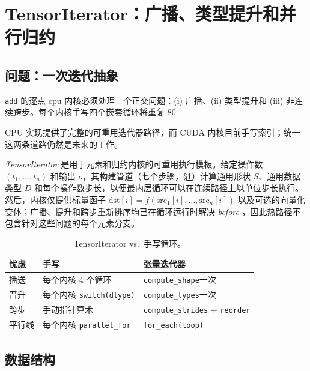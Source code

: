 \section{TensorIterator：广播、类型提升和并行归约}
\label{sec:tensoriterator}

\subsection{问题：一次迭代抽象}

\texttt{add} 的逐点 \ac{cpu} 内核必须处理三个正交问题：(i) 广播、(ii) 类型提升和 (iii) 非连续跨步。每个内核手写四个嵌套循环将重复 80%

CPU 实现提供了完整的可重用迭代器路径，而 CUDA 内核目前手写索引；统一这两条道路仍然是未来的工作。

\begin{tpdef}
\emph{TensorIterator} 是用于元素和归约内核的可重用执行模板。给定操作数 $(t_1,\dots,t_n)$ 和输出 $o$，其构建管道（七个步骤，\S\ref{sec:tensoriterator}）计算通用形状 $S$、通用数据类型 $D$ 和每个操作数步长，以便最内层循环可以在连续路径上以单位步长执行。然后，内核仅提供标量函子 $\mathrm{dst}[i] = f(\mathrm{src}_1[i],\dots,\mathrm{src}_n[i])$ 以及可选的向量化变体；广播、提升和跨步重新排序均已在循环运行时解决 \emph{before} ，因此热路径不包含针对这些问题的每个元素分支。
\end{tpdef}

\begin{table}[H]
\centering
\caption{TensorIterator vs.\ 手写循环。}
\label{tab:ti_vs_hand}
\small
\begin{tabular}{lll}
\toprule
忧虑 & 手写 & 张量迭代器 \\
\midrule
播送 & 每个内核 4 个循环 & \texttt{compute\_shape}一次 \\
晋升 & 每个内核 \texttt{switch(dtype)} & \texttt{compute\_types}一次 \\
跨步 & 手动指针算术 & \texttt{compute\_strides} + \texttt{reorder} \\
平行线 & 每个内核 \texttt{parallel\_for} & \texttt{for\_each(loop)} \\
\bottomrule
\end{tabular}
\end{table}

\subsection{数据结构}

